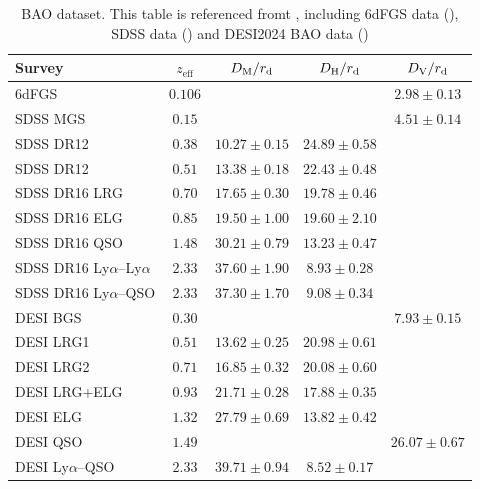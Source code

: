 \documentclass[preprint]{aastex631}
\begin{document}
\begin{table}
    \centering
    \begin{center}
    \begin{tabular}{lcccc}
    \hline\hline
    Survey          & $z_\text{eff}$ & $D_{\rm M}/r_{\rm d}$
                                     & $D_{\rm H}/r_{\rm d}$
                                     & $D_{\rm V}/r_{\rm d}$\\
    \hline
    6dFGS		    & $0.106$	& & & $2.98\pm0.13$ \\
    \hline
    SDSS MGS 		& $0.15$	& & & $4.51\pm0.14$ \\
    SDSS DR12		& $0.38$    & $10.27\pm0.15$
                                & $24.89\pm 0.58$ & \\
    SDSS DR12		& $0.51$    & $13.38\pm0.18$
                                & $22.43\pm 0.48$ & \\
    SDSS DR16 LRG	& $0.70$    & $17.65\pm0.30$
                                & $19.78\pm0.46$ & \\
    SDSS DR16 ELG	& $0.85$	& $19.50\pm1.00$
                                & $19.60\pm2.10$ & \\
    SDSS DR16 QSO	& $1.48$    & $30.21\pm0.79$
                                & $13.23\pm0.47$ & \\
    SDSS DR16 Ly$\alpha$--Ly$\alpha$
                    & $2.33$    & $37.60\pm1.90$
                                & $8.93\pm0.28$ & \\
    SDSS DR16 Ly$\alpha$--QSO	
                    & $2.33$    & $37.30\pm1.70$
                                & $9.08\pm0.34$ & \\
    \hline
    DESI BGS 		& $0.30$    & & & $7.93\pm0.15$ \\
    DESI LRG1	 	& $0.51$ 	& $13.62\pm0.25$
                                & $20.98\pm0.61$ & \\
    DESI LRG2       & $0.71$ 	& $16.85\pm0.32$
                                & $20.08\pm0.60 $& \\
    DESI LRG+ELG    & $0.93$    & $21.71\pm0.28$
                                & $17.88\pm0.35$ & \\
    DESI ELG        & $1.32$    & $27.79\pm0.69$
                                & $13.82\pm0.42$ & \\
    DESI QSO		& $1.49$	& & & $26.07\pm0.67$ \\
    DESI Ly$\alpha$--QSO
                    & $2.33$ 	& $39.71\pm0.94$
                                & $8.52\pm0.17$ & \\
    \hline
    \end{tabular}
    \end{center}
    \caption{BAO dataset. This table is referenced fromt \cite{luongoDarkEnergyReconstructions2024}, including 6dFGS data (\cite{Beutler_2011}), SDSS data (\cite{PhysRevD.103.083533}) and DESI2024 BAO data (\cite{desicollaboration2024desi2024vicosmological})}
    \label{tab:baodata}
\end{table}
\end{document}
